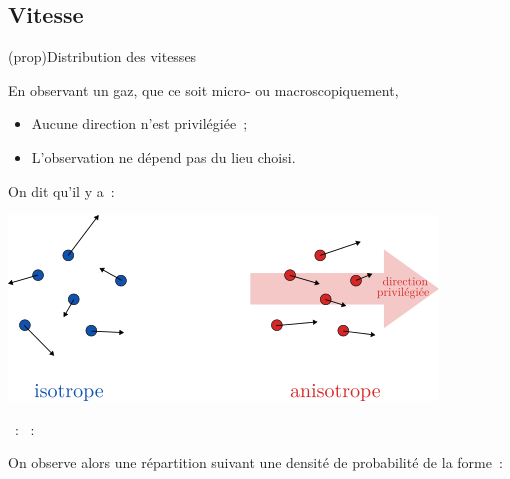 \documentclass[../../main/main.tex]{subfiles}
\begin{document}
\subsection{Vitesse}
\begin{tcb*}[breakable](prop){Distribution des vitesses}
	\noindent
	\begin{minipage}[c]{.57\linewidth}
		En observant un gaz, que ce soit micro- ou macroscopiquement,
		\begin{itemize}
			\item Aucune direction n'est privilégiée~;
			\item L'observation ne dépend pas du lieu choisi.
		\end{itemize}
		On dit qu'il y a~:
	\end{minipage}
	\begin{minipage}[c]{.40\linewidth}
		\begin{center}
			\includegraphics[width=\linewidth]{vitesse_iso}
		\end{center}
	\end{minipage}
	\begin{itemize}
		~: 
		~: 
	\end{itemize}
\end{tcb*}

On observe alors une répartition suivant une densité de probabilité de la
forme~:
\begin{center}
\end{center}
\end{document}
